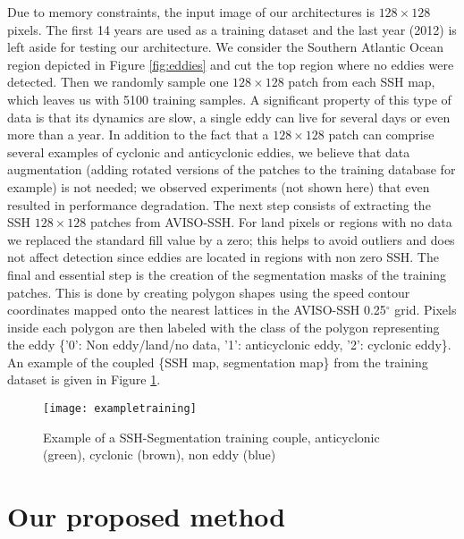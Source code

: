 \documentclass[journal]{IEEEtran}
\begin{document}
Due to memory constraints, the input image of our architectures is $128 \times 128$ pixels. The first 14 years are used as a training dataset and the last year (2012) is left aside for testing our architecture. We consider the Southern Atlantic Ocean region depicted in Figure \ref{fig:eddies} and cut the top region where no eddies were detected. Then we randomly sample  one $128 \times 128$ patch from each SSH map, which leaves us with 5100 training samples. A significant property of this type of data is that its dynamics are slow, a single eddy can live for several days or even more than a year. In addition to the fact that a $128 \times 128$ patch can comprise several examples of cyclonic and anticyclonic eddies, we believe that data augmentation (adding rotated versions of the patches to the training database for example) is not needed; we observed experiments (not shown here) that even resulted in performance degradation. The next step consists of extracting the SSH $128 \times 128$ patches from AVISO-SSH. For land pixels or regions with no data we replaced the standard fill value by a zero; this helps to  avoid outliers and does not affect detection since eddies are located in regions with non zero SSH. The final and essential step is the creation of the segmentation masks of the training patches. This is done by creating polygon shapes using the speed contour coordinates mapped onto the nearest lattices in the AVISO-SSH 0.25$^\circ$ grid. Pixels inside each polygon are then labeled with the class of the polygon representing the eddy \{'0': Non eddy/land/no data, '1': anticyclonic eddy, '2': cyclonic eddy\}. An example of the coupled \{SSH map, segmentation map\} from the training dataset is given in Figure \ref{fig:exampletraining}.

\begin{figure}[t]
\centering
\texttt{[image: exampletraining]}
\caption{Example of a SSH-Segmentation training couple, anticyclonic (green), cyclonic (brown), non eddy (blue)}
\label{fig:exampletraining}
\end{figure}

\section{Our proposed method}
\end{document}
